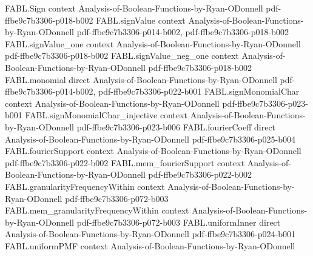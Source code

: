 \begin{theorem}
\label{FABL.FiniteFourierBasis.productTotalInfluence_eq_sum_degree_mul_weight}
\leanok
{}
\proofstep
  {FABL.Sign}
  {context}
  {Analysis-of-Boolean-Functions-by-Ryan-ODonnell}
  {pdf-ffbe9c7b3306-p018-b002}
\proofstep
  {FABL.signValue}
  {context}
  {Analysis-of-Boolean-Functions-by-Ryan-ODonnell}
  {pdf-ffbe9c7b3306-p014-b002,
    pdf-ffbe9c7b3306-p018-b002}
\proofstep
  {FABL.signValue_one}
  {context}
  {Analysis-of-Boolean-Functions-by-Ryan-ODonnell}
  {pdf-ffbe9c7b3306-p018-b002}
\proofstep
  {FABL.signValue_neg_one}
  {context}
  {Analysis-of-Boolean-Functions-by-Ryan-ODonnell}
  {pdf-ffbe9c7b3306-p018-b002}
\proofstep
  {FABL.monomial}
  {direct}
  {Analysis-of-Boolean-Functions-by-Ryan-ODonnell}
  {pdf-ffbe9c7b3306-p014-b002,
    pdf-ffbe9c7b3306-p022-b001}
\proofstep
  {FABL.signMonomialChar}
  {context}
  {Analysis-of-Boolean-Functions-by-Ryan-ODonnell}
  {pdf-ffbe9c7b3306-p023-b001}
\proofstep
  {FABL.signMonomialChar_injective}
  {context}
  {Analysis-of-Boolean-Functions-by-Ryan-ODonnell}
  {pdf-ffbe9c7b3306-p023-b006}
\proofstep
  {FABL.fourierCoeff}
  {direct}
  {Analysis-of-Boolean-Functions-by-Ryan-ODonnell}
  {pdf-ffbe9c7b3306-p025-b004}
\proofstep
  {FABL.fourierSupport}
  {context}
  {Analysis-of-Boolean-Functions-by-Ryan-ODonnell}
  {pdf-ffbe9c7b3306-p022-b002}
\proofstep
  {FABL.mem_fourierSupport}
  {context}
  {Analysis-of-Boolean-Functions-by-Ryan-ODonnell}
  {pdf-ffbe9c7b3306-p022-b002}
\proofstep
  {FABL.granularityFrequencyWithin}
  {context}
  {Analysis-of-Boolean-Functions-by-Ryan-ODonnell}
  {pdf-ffbe9c7b3306-p072-b003}
\proofstep
  {FABL.mem_granularityFrequencyWithin}
  {context}
  {Analysis-of-Boolean-Functions-by-Ryan-ODonnell}
  {pdf-ffbe9c7b3306-p072-b003}
\proofstep
  {FABL.uniformInner}
  {direct}
  {Analysis-of-Boolean-Functions-by-Ryan-ODonnell}
  {pdf-ffbe9c7b3306-p024-b001}
\proofstep
  {FABL.uniformPMF}
  {context}
  {Analysis-of-Boolean-Functions-by-Ryan-ODonnell}

\end{theorem}
